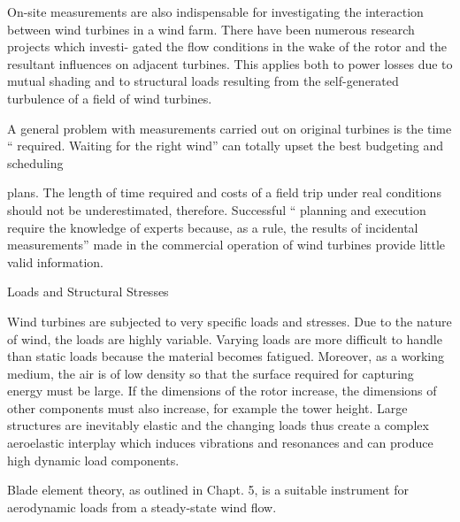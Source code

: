

On-site measurements are also indispensable for investigating the interaction between
wind turbines in a wind farm. There have been numerous research projects which investi-
gated the flow conditions in the wake of the rotor and the resultant influences on adjacent
turbines. This applies both to power losses due to mutual shading and to structural loads
resulting from the self-generated turbulence of a field of wind turbines.


A general
problem with measurements carried out on original turbines is the time
“
required. Waiting for the right wind” can totally upset the best budgeting and scheduling

plans. The length of time required and costs of a field trip under real conditions should not
be underestimated, therefore. Successful
“ planning and execution require the knowledge of
experts because, as a rule, the results of incidental measurements” made in the commercial
operation of wind turbines provide little valid information.

Loads and Structural Stresses

Wind turbines are subjected to very specific loads and stresses. Due to the nature of wind,
the loads are highly variable. Varying loads are more difficult to handle than static loads
because the material becomes fatigued. Moreover, as a working medium, the air is of low
density so that the surface required for capturing energy must be large. If the dimensions
of the rotor increase, the dimensions of other components must also increase, for example
the tower height. Large structures are inevitably elastic and the changing loads thus create
a complex aeroelastic interplay which induces vibrations and resonances and can produce
high dynamic load components.



Blade element
theory, as outlined in Chapt. 5, is a suitable instrument for aerodynamic loads from a
steady-state wind flow.




